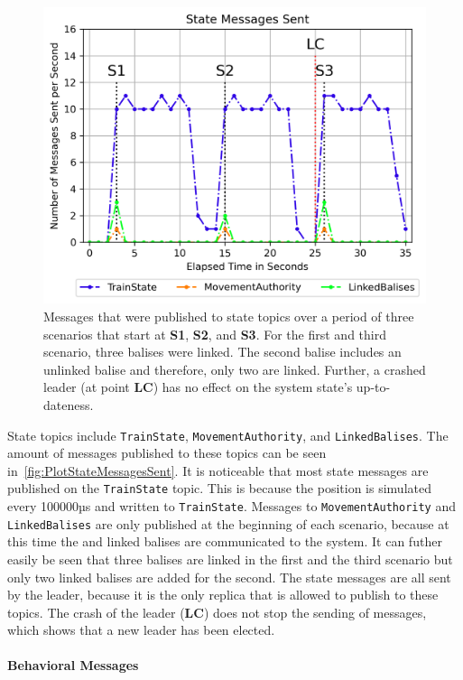 \begin{figure}[!hb]
	\centering
	\includegraphics[width=0.8\linewidth]{images/plots/StateMessagesSent}
	\caption{Messages that were published to state topics over a period of three scenarios that start at \textbf{S1}, \textbf{S2}, and \textbf{S3}. For the first and third scenario, three balises were linked. The second balise includes an unlinked balise and therefore, only two are linked. Further, a crashed leader (at point \textbf{LC}) has no effect on the system state's up-to-dateness. }
	\label{fig:PlotStateMessagesSent}
\end{figure}

State topics include \texttt{TrainState}, \texttt{MovementAuthority}, and \texttt{LinkedBalises}.
The amount of messages published to these topics can be seen in~\autoref{fig:PlotStateMessagesSent}.
It is noticeable that most state messages are published on the \texttt{TrainState} topic.
This is because the position is simulated every 100000µs and written to \texttt{TrainState}.
Messages to \texttt{MovementAuthority} and \texttt{LinkedBalises} are only published at the beginning of each scenario, because at this time the  and linked balises are communicated to the system.
It can futher easily be seen that three balises are linked in the first and the third scenario but only two linked balises are added for the second.
The state messages are all sent by the leader, because it is the only replica that is allowed to publish to these topics.
The crash of the leader (\textbf{LC}) does not stop the sending of messages, which shows that a new leader has been elected.


\paragraph{Behavioral Messages}

